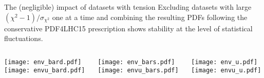 \begin{frame}{The (negligible) impact of datasets with tension}
    Excluding datasets with large $({\chi^{2}-1})/{\sigma_{\chi^{2}}}$ one at a time and combining the resulting PDFs following the conservative PDF4LHC15 prescription shows stability at the level of statistical fluctuations.
    \begin{columns}
        \begin{column}[T]{0.32\textwidth}
            \centering
            \texttt{[image: env\_bard.pdf]}\\
            \texttt{[image: envu\_bard.pdf]}
        \end{column}
        \begin{column}[T]{0.32\textwidth}
            \centering
            \texttt{[image: env\_bars.pdf]}\\
            \texttt{[image: envu\_bars.pdf]}
        \end{column}
        \begin{column}[T]{0.32\textwidth}
            \centering
            \texttt{[image: env\_u.pdf]}\\
            \texttt{[image: envu\_u.pdf]}
        \end{column}
    \end{columns}
\end{frame}



